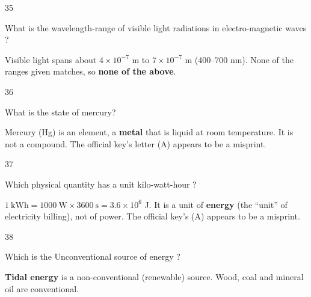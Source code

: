 \begin{question}{35}
{What is the wavelength-range of visible light radiations in electro-magnetic waves ?\par}
\begin{explain}
Visible light spans about $4\times10^{-7}$ m to $7\times10^{-7}$ m (400--700 nm). None of the ranges given matches, so \textbf{none of the above}.
\end{explain}
\end{question}

\begin{question}{36}
{What is the state of mercury?\par}
\begin{explain}
Mercury (Hg) is an element, a \textbf{metal} that is liquid at room temperature. It is not a compound. The official key's letter (A) appears to be a misprint.
\end{explain}
\end{question}

\begin{question}{37}
{Which physical quantity has a unit kilo-watt-hour ?\par}
\begin{explain}
$1\ \text{kWh}=1000\ \text{W}\times3600\ \text{s}=3.6\times10^6$ J. It is a unit of \textbf{energy} (the ``unit'' of electricity billing), not of power. The official key's (A) appears to be a misprint.
\end{explain}
\end{question}

\begin{question}{38}
{Which is the Unconventional source of energy ?\par}
\begin{explain}
\textbf{Tidal energy} is a non-conventional (renewable) source. Wood, coal and mineral oil are conventional.
\end{explain}
\end{question}

